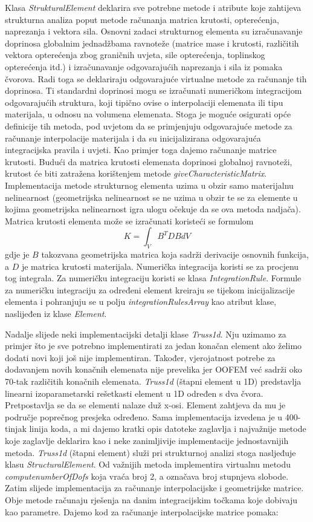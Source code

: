 \documentclass[a4paper,twoside,12pt]{memoir} %
\begin{document}
Klasa \textit{StrukturalElement} deklarira sve potrebne metode i atribute koje zahtijeva strukturna analiza poput metode računanja matrica krutosti, opterećenja, naprezanja i vektora sila. 
Osnovni zadaci strukturnog elementa su izračunavanje doprinosa globalnim jednadžbama ravnoteže (matrice mase i krutosti, različitih vektora opterećenja zbog graničnih uvjeta, sile opterećenja, toplinskog opterećenja itd.) i izračunavanje odgovarajućih naprezanja i sila iz pomaka čvorova. Radi toga se deklariraju odgovarajuće virtualne metode za računanje tih doprinosa. Ti standardni doprinosi mogu se izračunati numeričkom integracijom odgovarajućih struktura, koji tipično ovise o interpolaciji elemenata ili tipu materijala, u odnosu na volumena elemenata. Stoga je moguće osigurati opće definicije tih metoda, pod uvjetom da se primjenjuju odgovarajuće metode za računanje interpolacije materijala i da su inicijalizirana odgovarajuća integracijska pravila i uvjeti. Kao primjer toga dajemo računanje matrice krutosti. Budući da matrica krutosti elemenata doprinosi globalnoj ravnoteži, krutost će biti zatražena korištenjem metode \textit{giveCharacteristicMatrix}. Implementacija metode strukturnog elementa uzima u obzir samo materijalnu nelinearnost (geometrijska nelinearnost se ne uzima u obzir te se za elemente u kojima geometrijska nelinearnost igra ulogu očekuje da se ova metoda nadjača). Matrica krutosti elementa može se izračunati koristeći se formulom
$$ K = \int_V B^T D B dV $$
gdje je $B$ takozvana geometrijska matrica koja sadrži derivacije osnovnih funkcija, a $D$ je matrica krutosti materijala. Numerička integracija koristi se za procjenu tog integrala. Za numeričku integraciju koristi se klasa \textit{IntegrationRule}. Formule za numeričku integraciju za određeni element kreiraju se tijekom inicijalizacije elementa i pohranjuju se u polju \textit{integrationRulesArray} kao atribut klase, naslijeđen iz klase \textit{Element}. \par

Nadalje slijede neki implementacijski detalji klase \textit{Truss1d}. Nju uzimamo za primjer što je sve potrebno implementirati za jedan konačan element ako želimo dodati novi koji još nije implementiran. Također, vjerojatnost potrebe za dodavanjem novih konačnih elemenata nije prevelika jer OOFEM već sadrži oko 70-tak različitih konačnih elemenata. \textit{Truss1d} (štapni element u 1D) predstavlja linearni izoparametarski rešetkasti element u 1D određen s dva čvora. Pretpostavlja se da se elementi nalaze duž x-osi. Element zahtjeva da mu je područje poprečnog presjeka određeno. Sama implementacija izvedena je u 400-tinjak linija koda, a mi dajemo kratki opis datoteke zaglavlja i najvažnije metode koje zaglavlje deklarira kao i neke zanimljivije implementacije jednostavnijih metoda. \textit{Truss1d} (štapni element) služi pri strukturnoj analizi stoga nasljeđuje klasu \textit{StructuralElement}. Od važnijih metoda implementira virtualnu metodu \textit{computenumberOfDofs} koja vraća broj 2, a označava broj stupnjeva slobode. Zatim slijede implementacija za računanje interpolacijske i geometrijske matrice. Obje metode računaju rješenja na danim integracijskim točkama koje dobivaju kao parametre. Dajemo kod za računanje interpolacijske matrice pomaka:
\end{document}
